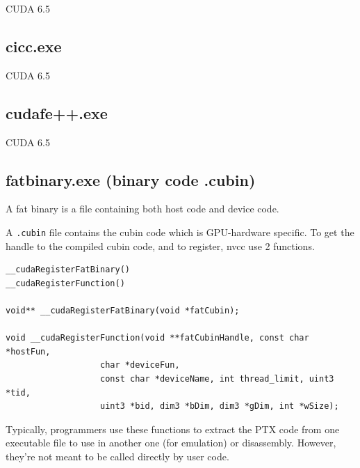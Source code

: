 CUDA 6.5

\subsection{cicc.exe}

CUDA 6.5

\subsection{cudafe++.exe}

CUDA 6.5

\subsection{fatbinary.exe (binary code .cubin)}
\label{sec:fatbin}
\label{sec:cubin}

A fat binary is a file containing both host code and device code. 

A \verb!.cubin! file contains the cubin code which is GPU-hardware specific.
To get the handle to the compiled cubin code, and to register, nvcc use 2
functions.
\begin{verbatim}
__cudaRegisterFatBinary()
__cudaRegisterFunction()

void** __cudaRegisterFatBinary(void *fatCubin);

void __cudaRegisterFunction(void **fatCubinHandle, const char *hostFun, 
                   char *deviceFun,
                   const char *deviceName, int thread_limit, uint3 *tid,
                   uint3 *bid, dim3 *bDim, dim3 *gDim, int *wSize);
\end{verbatim}
Typically, programmers use these functions to extract the PTX code from one executable file
to use in another one (for emulation) or disassembly. However, they're not meant
to be called directly by user code.

